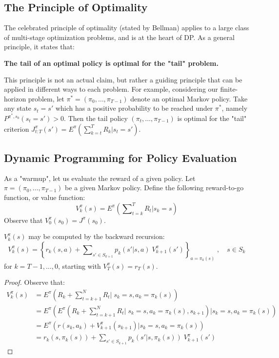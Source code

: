 \subsection{The Principle of Optimality}
The celebrated principle of optimality (stated by Bellman) applies to a large class of multi-stage optimization problems, and is at the heart of DP. As a general principle, it states that:
\begin{center}
\textbf{The tail of an optimal policy is optimal for the "tail" problem.}
\end{center}

This principle is not an actual claim, but rather a guiding principle that can be applied in different ways to each problem.
For example, considering our finite-horizon problem, let ${\pi ^*} = ({\pi _0}, \ldots ,{\pi _{T - 1}})$ denote an optimal Markov policy. Take any state ${s_t} = s'$ which has a positive probability to be reached under ${\pi ^*}$, namely ${P^{\pi^* ,{s_0}}}({s_t} = s') > 0$. Then the tail policy $({\pi _t}, \ldots ,{\pi _{T - 1}})$ is optimal for the "tail" criterion $J_{t:T}^\pi (s') = {E^\pi }\left( {\sum\nolimits_{k = t}^T {{R_k}|{s_t} = s'} } \right)$.


\subsection{Dynamic Programming for Policy Evaluation}\label{sss:pol_eval}
As a "warmup", let us evaluate the reward of a given policy.
Let $\pi  = ({\pi _0}, \ldots ,{\pi _{T - 1}})$ be a given Markov policy. Define the following reward-to-go function, or value function:
\[V_k^\pi (s) = {E^\pi }\left( {\sum\nolimits_{t = k}^T {{R_t}|{s_k} = s} } \right)\]
Observe that $V_0^\pi ({s_0}) = {J^\pi }({s_0})$.

\begin{lemma}\label{lem:finite_horizon_VI} $V_k^\pi (s)$ may be computed by the backward recursion:
\[V_k^\pi (s) = {\left\{ {{r_k}(s,a) + \sum\nolimits_{s' \in {S_{k + 1}}} {{p_k}(s'|s,a)} \;V_{k + 1}^\pi (s')} \right\}_{a = {\pi _k}(s)}}\;,\quad s \in {S_k}\]
for $k =  T - 1, \ldots ,0 $,  starting with  $V_T^\pi (s) = {r_T}(s)$.
\end{lemma}
\begin{proof}
Observe that:
\begin{align*}
V_k^\pi (s) &= {E^\pi }\left( {{R_k} + \sum\nolimits_{t = k + 1}^N {{R_t}|} \;{s_k} = s,{a_k} = {\pi _k}(s)} \right)\\
 &= {E^\pi }\left( {{E^\pi }\left( {{R_k} + \sum\nolimits_{t = k + 1}^N {{R_t}} |\;{s_k} = s,{a_k} = {\pi _k}(s),{s_{k + 1}}} \right)|{s_k} = s,{a_k} = {\pi _k}(s)} \right)\\
 &= {E^\pi }\left( {r({s_k},{a_k}) + V_{k + 1}^\pi ({s_{k + 1}})|{s_k} = s,{a_k} = {\pi _k}(s)} \right)\\
 &= {r_k}(s,{\pi _k}(s)) + \sum\nolimits_{s' \in {S_{k + 1}}} {{p_k}(s'|s,{\pi _k}(s))} \;V_{k + 1}^\pi (s')
\end{align*}
\end{proof}
